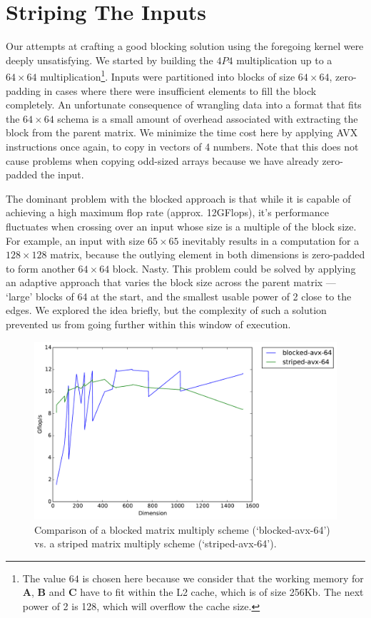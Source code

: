\documentclass{scrartcl}
\begin{document}
  \section{Striping The Inputs}
  Our attempts at crafting a good blocking solution using the foregoing kernel were deeply unsatisfying. We started by building the $4P4$ multiplication up to a $64 \times 64$ multiplication\footnote{The value $64$ is chosen here because we consider that the working memory for $\mathbf{A}$, $\mathbf{B}$ and $\mathbf{C}$ have to fit within the L2 cache, which is of size 256Kb. The next power of 2 is 128, which will overflow the cache size.}. Inputs were partitioned into blocks of size $64 \times 64$, zero-padding in cases where there were insufficient elements to fill the block completely. An unfortunate consequence of wrangling data into a format that fits the $64 \times 64$ schema is a small amount of overhead associated with extracting the block from the parent matrix. We minimize the time cost here by applying AVX instructions once again, to copy in vectors of 4 numbers. Note that this does not cause problems when copying odd-sized arrays because we have already zero-padded the input.

  The dominant problem with the blocked approach is that while it is capable of achieving a high maximum flop rate (approx. 12GFlops), it's performance fluctuates when crossing over an input whose size is a multiple of the block size. For example, an input with size $65 \times 65$ inevitably results in a computation for a $128 \times 128$ matrix, because the outlying element in both dimensions is zero-padded to form another $64 \times 64$ block. Nasty. This problem could be solved by applying an adaptive approach that varies the block size across the parent matrix --- `large' blocks of 64 at the start, and the smallest usable power of 2 close to the edges. We explored the idea briefly, but the complexity of such a solution prevented us from going further within this window of execution.

  \begin{figure}[ht!]
    \centering
    \includegraphics[width=\textwidth]{timing-blocked-vs-striped}
    \caption{Comparison of a blocked matrix multiply scheme (`blocked-avx-64') vs. a striped matrix multiply scheme (`striped-avx-64').\label{fig:avx-2}}
  \end{figure}
\end{document}
